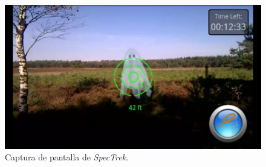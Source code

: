 \begin{itemize}
\begin{figure}[H]
    \centering
    \includegraphics[scale=0.12]{Images/Estado del arte/specktrek.png}
    \caption[Captura de pantalla de \textit{SpecTrek}]{Captura de pantalla de \textit{SpecTrek}\footnotemark.}
    \label{fig:SpecTrk}
\end{figure}



\end{itemize}
